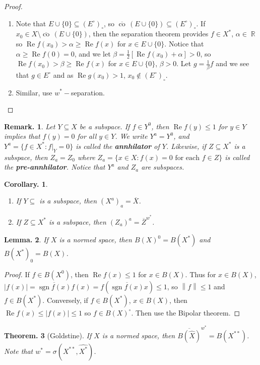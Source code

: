 \documentclass[11pt, a4paper]{memoir}
\DeclareMathOperator{\R}{{\mathbb{R}}}
\newcommand{\norm}[1]{\ensuremath{\left\lVert#1\right\rVert}}
\theoremstyle{change}
\newtheorem{theorem}{Theorem.}[section]
\newtheorem{lemma}[theorem]{Lemma.}
\newtheorem{corollary}[theorem]{Corollary.}
\theoremstyle{plain}
\theoremstyle{nonumberplain}
\newtheorem{remark}{Remark.}
\newtheorem{proof}{Proof}
\DeclareMathOperator{\sgn}{sgn}
\renewcommand{\Re}{\ensuremath{\operatorname{Re}}}
\newcommand{\cw}{\ensuremath{\overline{\operatorname{co}}\,}}
\numberwithin{equation}{section}
\begin{document}
\begin{proof}
    \begin{enumerate}[nl,r]
        \item Note that $E\cup\{0\}\subseteq (E^\circ)_\circ$, so $\cw(E\cup\{0\})\subseteq(E^\circ)_\circ$.
            If $x_0\in X\setminus\cw(E\cup\{0\})$, then the separation theorem provides $f\in X^*$, $\alpha\in \R$ so $\Re f(x_0)>\alpha\geq\Re f(x)$ for $x\in E\cup\{0\}$.
            Notice that $\alpha\geq \Re f(0)=0$, and we let $\beta=\frac{1}{2}[\Re f(x_0)+\alpha]>0$, so $\Re f(x_0)>\beta\geq\Re f(x)$ for $x\in E\cup\{0\}$, $\beta>0$.
            Let $g=\frac{1}{\beta}f$ and we see that $g\in E^\circ$ and as $\Re g(x_0)>1$, $x_0\notin (E^\circ)_\circ$.
        \item Similar, use $w^*-$separation.
    \end{enumerate}
\end{proof}
\begin{remark}
    Let $Y\subseteq X$ be a subspace.
    If $f\in Y^0$, then $\Re f(y)\leq 1$ for $y\in Y$ implies that $f(y)=0$ for all $y\in Y$.
    We write $Y^a=Y^0$, and $Y^a=\{f\in X^*:f|_Y=0\}$ is called the \textbf{annhilator} of $Y$.
    Likewise, if $Z\subseteq X^*$ is a subspace, then $Z_a=Z_0$ where $Z_a=\{x\in X:f(x)=0\text{ for each }f\in Z\}$ is called the \textbf{pre-annhilator}.
    Notice that $Y^a$ and $Z_a$ are subspaces.
\end{remark}
\begin{corollary}
    \begin{enumerate}[nl,r]
        \item If $Y\subseteq $ is a subspace, then $(X^a)_a=\overline{X}$.
        \item If $Z\subseteq X^*$ is a subspace, then $(Z_a)^a=\overline{Z}^{w^*}$.
    \end{enumerate}
\end{corollary}
\begin{lemma}
    If $X$ is a normed space, then $B(X)^0=B(X^*)$ and $B(X^*)_0=B(X)$.
\end{lemma}
\begin{proof}
    If $f\in B(X^0)$, then $\Re f(x)\leq 1$ for $x\in B(X)$.
    Thus for $x\in B(X)$, $|f(x)|=\overline{\sgn f(x)}f(x)=f(\overline{\sgn f(x)}x)\leq 1$, so $\norm{f}\leq 1$ and $f\in B(X^*)$.
    Conversely, if $f\in B(X^*)$, $x\in B(X)$, then $\Re f(x)\leq|f(x)|\leq 1$ so $f\in B(X)^\circ$.
    Then use the Bipolar theorem.
\end{proof}
\begin{theorem}[Goldstine]
    If $X$ is a normed space, then $\overline{B(\hat X)}^{w^*}=B(X^{**})$.
    Note that $w^*=\sigma(X^{**},\hat{X^*})$.
\end{theorem}
\end{document}

